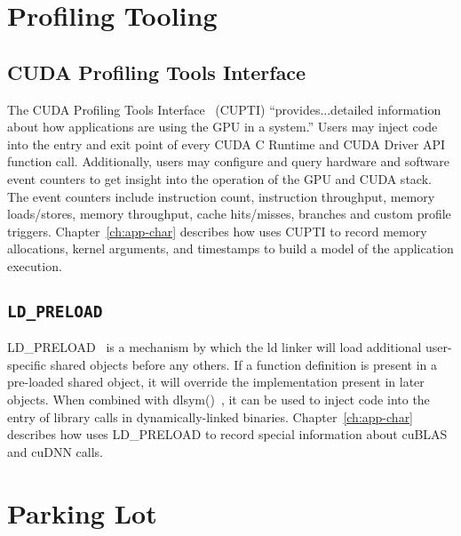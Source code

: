




\section{Profiling Tooling}
\label{sec:profiling}

\subsection{CUDA Profiling Tools Interface}
\label{sec:cupti}

The CUDA Profiling Tools Interface~\cite{nvidia2017cupti} (CUPTI) ``provides...detailed information about how applications are using the GPU in a system.''
Users may inject code into the entry and exit point of every CUDA C Runtime and CUDA Driver API function call.
Additionally, users may configure and query hardware and software event counters to get insight into the operation of the GPU and CUDA stack.
The event counters include instruction count, instruction throughput, memory loads/stores, memory throughput, cache hits/misses, branches and custom profile triggers.
Chapter~\ref{ch:app-char} describes how  uses CUPTI to record memory allocations, kernel arguments, and timestamps to build a model of the application execution.

\subsection{\texttt{LD\_PRELOAD}}
\label{sec:ldpreload}

LD\_PRELOAD~\cite{kerrisk2017ld} is a mechanism by which the ld linker will load additional user-specific shared objects before any others.
If a function definition is present in a pre-loaded shared object, it will override the implementation present in later objects.
When combined with dlsym()~\cite{kerrisk2017dlysm}, it can be used to inject code into the entry of library calls in dynamically-linked binaries.
Chapter~\ref{ch:app-char} describes how  uses LD\_PRELOAD to record special information about cuBLAS and cuDNN calls.

\cite{kerrisk2017ld}





\section{Parking Lot}

